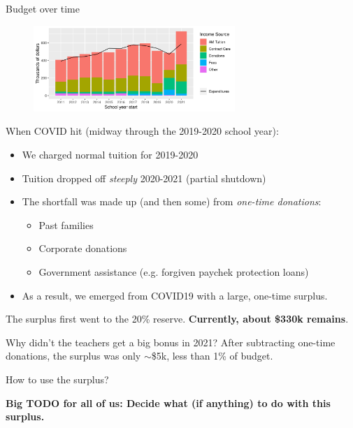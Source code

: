 \documentclass[8pt]{beamer}
\begin{document}
\begin{frame}{Budget over time}
\begin{figure}
\begin{center}
\includegraphics[width=3in]{budget_history_w_income_source.png}
\end{center}
\end{figure}

When COVID hit (midway through the 2019-2020 school year):
%
\begin{itemize}
%
\item We charged normal tuition for 2019-2020
\item Tuition dropped off {\em steeply} 2020-2021 (partial shutdown)
\item The shortfall was made up (and then some) from {\em one-time donations}:
\begin{itemize}
    \item Past families
    \item Corporate donations
    \item Government assistance (e.g. forgiven paychek protection loans)
\end{itemize}
\item As a result, we emerged from COVID19 with a large, one-time surplus.
%
\end{itemize}
%
The surplus first went to the 20\% reserve.
\textbf{Currently, about \$330k remains}.

Why didn't the teachers get a big bonus in 2021?  After subtracting one-time
donations, the surplus was only $\sim$\$5k, less than 1\% of budget.

\end{frame}


\begin{frame}{How to use the surplus?}

\textbf{Big TODO for all of us: Decide what (if
anything) to do with this surplus.}

\end{frame}
\end{document}
